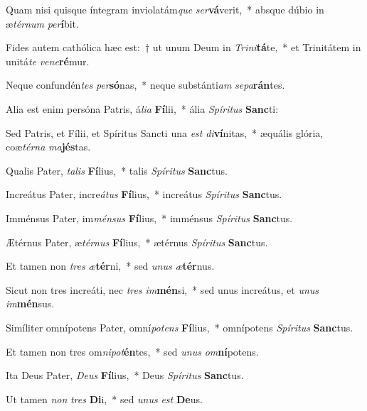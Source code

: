 \item Quam nisi quisque íntegram inviolatám\textit{que} \textit{ser}\textbf{vá}verit,~* absque dúbio in æ\textit{tér}\textit{num} \textit{per}\textbf{í}bit.
\item Fides autem cathólica hæc est:~† ut unum Deum in \textit{Tri}\textit{ni}\textbf{tá}te,~* et Trinitátem in unitá\textit{te} \textit{ve}\textit{ne}\textbf{ré}mur.
\item Neque confundén\textit{tes} \textit{per}\textbf{só}nas,~* neque substánti\textit{am} \textit{se}\textit{pa}\textbf{rán}tes.
\item Alia est enim persóna Patris, á\textit{li}\textit{a} \textbf{Fí}lii,~* ália \textit{Spí}\textit{ri}\textit{tus} \textbf{Sanc}ti:
\item Sed Patris, et Fílii, et Spíritus Sancti una \textit{est} \textit{di}\textbf{ví}nitas,~* æquális glória, coæ\textit{tér}\textit{na} \textit{ma}\textbf{jés}tas.
\item Qualis Pater, \textit{ta}\textit{lis} \textbf{Fí}lius,~* talis \textit{Spí}\textit{ri}\textit{tus} \textbf{Sanc}tus.
\item Increátus Pater, incre\textit{á}\textit{tus} \textbf{Fí}lius,~* increátus \textit{Spí}\textit{ri}\textit{tus} \textbf{Sanc}tus.
\item Imménsus Pater, im\textit{mén}\textit{sus} \textbf{Fí}lius,~* imménsus \textit{Spí}\textit{ri}\textit{tus} \textbf{Sanc}tus.
\item Ætérnus Pater, æ\textit{tér}\textit{nus} \textbf{Fí}lius,~* ætérnus \textit{Spí}\textit{ri}\textit{tus} \textbf{Sanc}tus.
\item Et tamen non \textit{tres} \textit{æ}\textbf{tér}ni,~* sed \textit{u}\textit{nus} \textit{æ}\textbf{tér}nus.
\item Sicut non tres increáti, nec \textit{tres} \textit{im}\textbf{mén}si,~* sed unus increátus, et \textit{u}\textit{nus} \textit{im}\textbf{mén}sus.
\item Simíliter omnípotens Pater, omní\textit{pot}\textit{ens} \textbf{Fí}lius,~* omnípotens \textit{Spí}\textit{ri}\textit{tus} \textbf{Sanc}tus.
\item Et tamen non tres om\textit{ni}\textit{pot}\textbf{én}tes,~* sed \textit{u}\textit{nus} \textit{om}\textbf{ní}potens.
\item Ita Deus Pater, \textit{De}\textit{us} \textbf{Fí}lius,~* Deus \textit{Spí}\textit{ri}\textit{tus} \textbf{Sanc}tus.
\item Ut tamen \textit{non} \textit{tres} \textbf{Di}i,~* sed \textit{u}\textit{nus} \textit{est} \textbf{De}us.
